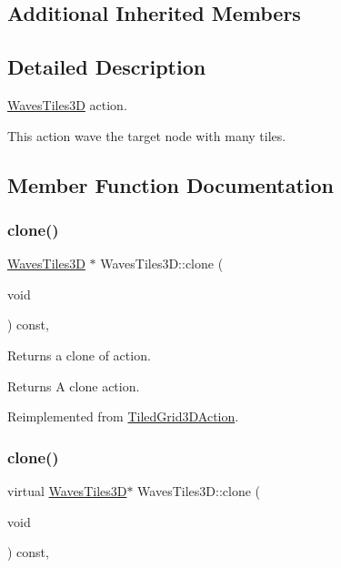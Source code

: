 \subsection*{Additional Inherited Members}


\subsection{Detailed Description}
\hyperlink{classWavesTiles3D}{Waves\+Tiles3D} action. 

This action wave the target node with many tiles. 

\subsection{Member Function Documentation}
\mbox{\label{classWavesTiles3D_a950db06f66d1b1c3b5bdfe053db5bffb}} 
\subsubsection{\texorpdfstring{clone()}{clone()}\hspace{0.1cm}{\footnotesize\ttfamily [1/2]}}
{\footnotesize\ttfamily \hyperlink{classWavesTiles3D}{Waves\+Tiles3D} $\ast$ Waves\+Tiles3\+D\+::clone (\begin{DoxyParamCaption}\item[{void}]{ }\end{DoxyParamCaption}) const\hspace{0.3cm}{\ttfamily [override]}, {\ttfamily [virtual]}}

Returns a clone of action.

\begin{DoxyReturn}{Returns}
A clone action. 
\end{DoxyReturn}


Reimplemented from \hyperlink{classTiledGrid3DAction_a689fd377cc0abae91db7def106529b53}{Tiled\+Grid3\+D\+Action}.

\mbox{\label{classWavesTiles3D_a7c7d226d6bf5f33041a4c54d062757b8}} 
\subsubsection{\texorpdfstring{clone()}{clone()}\hspace{0.1cm}{\footnotesize\ttfamily [2/2]}}
{\footnotesize\ttfamily virtual \hyperlink{classWavesTiles3D}{Waves\+Tiles3D}$\ast$ Waves\+Tiles3\+D\+::clone (\begin{DoxyParamCaption}\item[{void}]{ }\end{DoxyParamCaption}) const\hspace{0.3cm}{\ttfamily [override]}, {\ttfamily [virtual]}}

